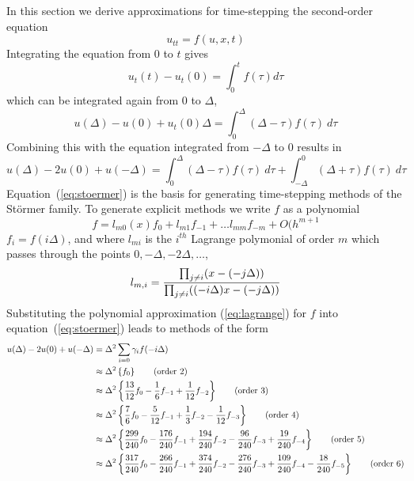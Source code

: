 \documentclass[10pt]{article}
\begin{document}
In this section we derive approximations for time-stepping the second-order equation
\begin{equation}
     u_{tt} = f(u,x,t)
\end{equation}
Integrating the equation from $0$ to $t$ gives
\[
    u_t(t) - u_t(0) = \int_0^{t} f(\tau) d\tau
\]
which can be integrated again from $0$ to $\Delta$,
\[
   u(\Delta)-u(0) + u_t(0)\Delta = \int_0^\Delta (\Delta -\tau) f(\tau) ~d\tau
\]
Combining this with the equation integrated from $-\Delta$ to $0$ results in
\begin{equation}
  u(\Delta)-2u(0) + u(-\Delta) = \int_0^\Delta (\Delta -\tau) f(\tau) ~d\tau
                                +\int_{-\Delta}^0 (\Delta +\tau) f(\tau) ~d\tau \label{eq:stoermer}
\end{equation}
Equation~(\ref{eq:stoermer}) is the basis for generating time-stepping methods of the
St\"ormer family. To generate explicit methods we write $f$ as a polynomial
\begin{equation}
   f = l_{m0}(x) f_0 + l_{m1} f_{-1} + \ldots l_{mm} f_{-m} + O(h^{m+1}  \label{eq:lagrange}
\end{equation}
$f_i = f(i\Delta)$, and 
where $l_{mi}$ is the $i^{th}$ Lagrange polymonial of order $m$ which passes through
the points $0,-\Delta,-2\Delta,\ldots$, 
\[
    l_{m,i} = { \prod_{j\ne i}  (x - (-j\Delta)) \over \prod_{j\ne i} ((-i\Delta)x - (-j\Delta)) }
\]
Substituting the polynomial approximation (\ref{eq:lagrange}) for $f$ into equation~(\ref{eq:stoermer})
leads to methods of the form
\begin{align*}
   u(\Delta)-2u(0) + u(-\Delta) & = \Delta^2 \sum_{i=0} \gamma_i f(-i\Delta) \\
   & \approx \Delta^2\left\{ f_0 \right\}\qquad\mbox{(order 2)}\\
   & \approx \Delta^2\left\{ {13\over12} f_0 - {1\over 6} f_{-1} + {1\over 12} f_{-2} \right\}\qquad\mbox{(order 3)}\\
   & \approx \Delta^2\left\{ {7\over6} f_0 - {5\over12} f_{-1} + {1\over 3} f_{-2} 
                           -{1\over 12} f_{-3} \right\}\qquad\mbox{(order 4)}\\
   & \approx \Delta^2\left\{ {299\over240} f_0 - {176\over240} f_{-1} + {194\over240} f_{-2} 
                           -{96\over240} f_{-3} + {19\over240} f_{-4} \right\}\qquad\mbox{(order 5)}\\
   & \approx \Delta^2\left\{ {317\over240} f_0 - {266\over240} f_{-1} + {374\over240} f_{-2} 
             -{276\over240} f_{-3} + {109\over240} f_{-4} - {18\over240} f_{-5} \right\}\qquad\mbox{(order 6)}\\
\end{align*}
\end{document}
